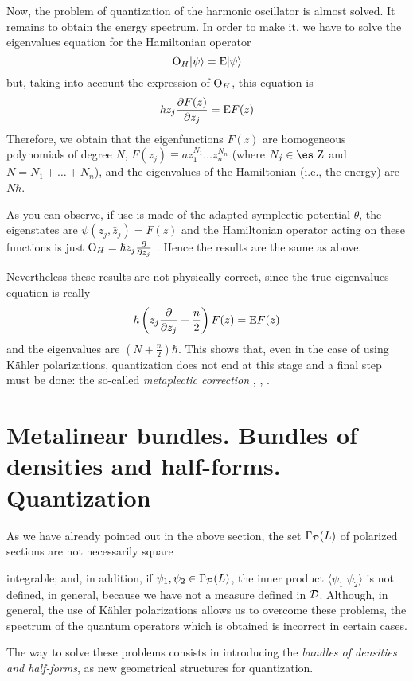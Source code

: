 \documentclass[12pt]{article}
\def\dst{\(}
\def\derpar#1#2{\frac{\partial{#1}}{\partial{#2}}}
\def\P{{\cal P}}
\def\D{{\cal D}}
\def\sta{|\psi \rangle }
\def\Op{{\rm O}}
\def\Zahl{\mbox{\es Z}}
\begin{document}
Now, the problem of quantization of the harmonic oscillator
is almost solved. It remains to obtain the
energy spectrum. In order to make it,
we have to solve the eigenvalues equation
for the Hamiltonian operator
$$
\Op_H \sta = {\rm E} \sta
$$
but, taking into account the expression of $\Op_H$,
this equation is
$$
\hbar z_j \derpar{F(z)}{z_j} = {\rm E} F(z)
$$
Therefore, we obtain that
the eigenfunctions $F(z)$ are homogeneous polynomials
of degree $N$, $F(z_j) \equiv a z_1^{N_1}\ldots z_n^{N_n}$
(where $N_j \in \Zahl$ and $N=N_1+\ldots +N_n$), and
the eigenvalues of the Hamiltonian
(i.e., the energy) are $N\hbar$.

As you can observe, if use is made of the adapted symplectic potential
$\theta$, the eigenstates are
$\psi (z_j,\bar z_j) = F(z)$
and the Hamiltonian operator acting on these functions is just
\dst\Op_H = \hbar z_j \derpar{}{z_j}\) .
Hence the results are the same as above.

Nevertheless these results are not physically correct,
since the true eigenvalues equation is really
$$
\hbar\left(z_j \derpar{}{z_j} +\frac{n}{2}\right)F(z) = {\rm E} F(z)
$$
and the eigenvalues are $(N+\frac{n}{2})\hbar$.
This shows that, even in the case of using
K\"ahler polarizations, quantization does not end
at this stage and a final step must be done:
the so-called {\it metaplectic correction}
\cite{Sn-80}, \cite{Tu-85}, \cite{Wo-80}.



\section{Metalinear bundles. Bundles of densities and half-forms.
\\ Quantization}


As we have already pointed out in the above section,
the set $\Gamma_\P (L)$ of polarized sections are not necessarily square

integrable;
and, in addition, if $\psi_1,\psi_2 \in \Gamma_\P (L)$,
the inner product $\langle \psi_1 | \psi_2 \rangle$
is not defined, in general, because we have not
a measure defined in $\D$.
Although, in general, the use of K\"ahler polarizations
allows us to overcome these problems, the spectrum of the quantum
operators
which is obtained is incorrect in certain cases.

The way to solve these problems consists in introducing
the {\it bundles of densities and half-forms}, as new geometrical
structures
for quantization.
\end{document}
